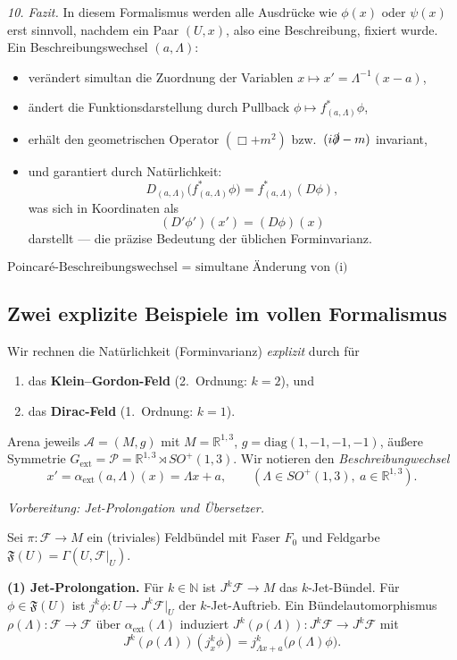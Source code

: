 \documentclass[10pt, letterpaper]{article}
\newcommand{\R}{\mathbb{R}}
\newcommand{\N}{\mathbb{N}}
\begin{document}
\bigskip
\emph{10. Fazit.}
In diesem Formalismus werden alle Ausdrücke wie $\phi(x)$ oder $\psi(x)$
erst sinnvoll, nachdem ein Paar $(U,x)$, also eine Beschreibung, fixiert wurde.
Ein Beschreibungswechsel $(a,\Lambda)$:
\begin{itemize}
\item verändert simultan die Zuordnung der Variablen $x\mapsto x'=\Lambda^{-1}(x-a)$,
\item ändert die Funktionsdarstellung durch Pullback $\phi\mapsto f_{(a,\Lambda)}^*\phi$,
\item erhält den geometrischen Operator $(\Box+m^2)$ bzw.\ $(i\slashed{\partial}-m)$ invariant,
\item und garantiert durch Natürlichkeit:
\[
D_{(a,\Lambda)}\big(f_{(a,\Lambda)}^*\phi\big)
= f_{(a,\Lambda)}^*(D\phi),
\]
was sich in Koordinaten als
\[
(D'\phi')(x') = (D\phi)(x)
\]
darstellt — die präzise Bedeutung der üblichen Forminvarianz.
\end{itemize}

\[
\boxed{
\text{Poincaré-Beschreibungswechsel = simultane Änderung von (i) Variablenvorschrift, (ii) Funktionsdarstellung, und (iii) Pullback des Operators.}
}
\]


\pagebreak



\subsection{Zwei explizite Beispiele im vollen Formalismus}
Wir rechnen die Natürlichkeit (Forminvarianz) \emph{explizit} durch für
\begin{enumerate}
\item das \textbf{Klein–Gordon-Feld} (2.\ Ordnung: $k=2$), und
\item das \textbf{Dirac-Feld} (1.\ Ordnung: $k=1$).
\end{enumerate}
Arena jeweils $\mathcal A=(M,g)$ mit $M=\R^{1,3}$, $g=\mathrm{diag}(1,-1,-1,-1)$,
äußere Symmetrie $G_{\mathrm{ext}}=\mathcal P=\R^{1,3}\rtimes SO^+(1,3)$.
Wir notieren den \emph{Beschreibungwechsel}
\[
x'=\alpha_{\mathrm{ext}}(a,\Lambda)(x)=\Lambda x + a,
\qquad (\Lambda\in SO^+(1,3),\ a\in\R^{1,3}).
\]

\bigskip
\emph{Vorbereitung: Jet-Prolongation und Übersetzer.}

Sei $\pi:\mathcal F\to M$ ein (triviales) Feldbündel mit Faser $F_0$ und Feldgarbe
$\mathfrak F(U)=\Gamma(U,\mathcal F|_U)$.

\textbf{(1) Jet-Prolongation.} Für $k\in\N$ ist $J^k\mathcal F\to M$ das $k$-Jet-Bündel.
Für $\phi\in\mathfrak F(U)$ ist $j^k\phi:U\to J^k\mathcal F|_U$ der $k$-Jet-Auftrieb.
Ein Bündelautomorphismus $\rho(\Lambda):\mathcal F\to\mathcal F$ über $\alpha_{\mathrm{ext}}(\Lambda)$
induziert $J^k(\rho(\Lambda)) : J^k\mathcal F\to J^k\mathcal F$ mit
\[
J^k(\rho(\Lambda))(j_x^k\phi)=j_{\Lambda x+a}^k\!\big(\rho(\Lambda)\phi\big).
\]
\end{document}
